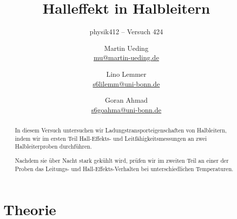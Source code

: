 


\usepackage[section]{placeins}
\usepackage{booktabs}
\usepackage{pdflscape}
\usepackage{tikz}
\usetikzlibrary{arrows}

\newcommand\versuchsnummer{424}
\DeclareMathOperator\std{std}

\newcommand\erklaerungFehlerNotation{%
In dieser Notation bedeutet \num{1.234 +- 0.005}, dass der Wert
$\num{1.234} \pm \num{0.005}$ ist. Die Ziffern in Klammern sind die
Fehlerangabe. Um den Fehler zu erhalten, wird diese von rechts über die
Zahl gelegt, alle anderen Stellen werden auf 0 gesetzt.
}

\ihead{physik412 – Versuch \versuchsnummer}

\subject{Praktikumsprotokoll}
\title{Halleffekt in Halbleitern}
\subtitle{physik412 – Versuch \versuchsnummer}
\author{
Martin Ueding \\
\small{\href{mailto:mu@martin-ueding.de}{mu@martin-ueding.de}}
\and
Lino Lemmer \\
\small{\href{mailto:s6lilemm@uni-bonn.de}{s6lilemm@uni-bonn.de}}
\and
Goran Ahmad \\
\small{\href{mailto:s6goahma@uni-bonn.de}{s6goahma@uni-bonn.de}}
}
\publishers{Tutor: Christian Hammann}

\setcounter{secnumdepth}{4}
\setcounter{tocdepth}{3}



\maketitle

\begin{abstract}
In diesem Versuch untersuchen wir Ladungstransporteigenschaften von
Halbleitern, indem wir im ersten Teil Hall-Effekts- und
Leitfähigkeitsmessungen an zwei Halbleiterproben durchführen.

Nachdem sie über Nacht stark gekühlt wird, prüfen wir im zweiten Teil an einer
der Proben das Leitungs- und Hall-Effekts-Verhalten bei unterschiedlichen
Temperaturen.
\end{abstract}

\tableofcontents

\newcommand\probeA{InAs~HF-540}
\newcommand\probeB{InAs~HF-301-040}

\chapter{Theorie}

